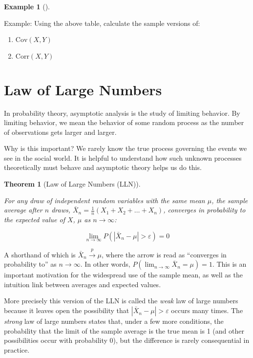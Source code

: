 \documentclass[
  letterpaper,
]{book}
\providecommand{\tightlist}{%
  \setlength{\itemsep}{0pt}\setlength{\parskip}{0pt}}\usepackage{longtable,booktabs,array}
\theoremstyle{definition}
\theoremstyle{definition}
\newtheorem{example}{Example}[chapter]
\theoremstyle{plain}
\theoremstyle{definition}
\theoremstyle{plain}
\newtheorem{theorem}{Theorem}[chapter]
\theoremstyle{plain}
\theoremstyle{remark}
\begin{document}
\leavevmode{}%
\begin{example}[]\label{exm-}

Example: Using the above table, calculate the sample versions of:

\begin{enumerate}
\def\labelenumi{\arabic{enumi}.}
\tightlist
\item
  \(\text{Cov}(X,Y)\)
\item
  \(\text{Corr}(X, Y)\)
\end{enumerate}

\end{example}

\hypertarget{law-of-large-numbers}{%
\section{Law of Large Numbers}\label{law-of-large-numbers}}

In probability theory, asymptotic analysis is the study of limiting
behavior. By limiting behavior, we mean the behavior of some random
process as the number of observations gets larger and larger.

Why is this important? We rarely know the true process governing the
events we see in the social world. It is helpful to understand how such
unknown processes theoretically must behave and asymptotic theory helps
us do this.

\leavevmode{}%
\begin{theorem}[Law of Large Numbers (LLN)]\label{thm-lln}

For any draw of independent random variables with the same mean \(\mu\),
the sample average after \(n\) draws,
\(\bar{X}_n = \frac{1}{n}(X_1 + X_2 + \ldots + X_n)\), converges in
probability to the expected value of \(X\), \(\mu\) as
\(n \rightarrow \infty\):

\[\lim\limits_{n\to \infty} P(|\bar{X}_n - \mu | > \varepsilon) = 0\]

\end{theorem}

A shorthand of which is \(\bar{X}_n \xrightarrow{p} \mu\), where the
arrow is read as ``converges in probability to'' as \(n\to \infty\). In
other words, \(P( \lim_{n\to\infty}\bar{X}_n = \mu) = 1\). This is an
important motivation for the widespread use of the sample mean, as well
as the intuition link between averages and expected values.

More precisely this version of the LLN is called the \emph{weak} law of
large numbers because it leaves open the possibility that
\(|\bar{X}_n - \mu | > \varepsilon\) occurs many times. The
\emph{strong} law of large numbers states that, under a few more
conditions, the probability that the limit of the sample average is the
true mean is 1 (and other possibilities occur with probability 0), but
the difference is rarely consequential in practice.
\end{document}
